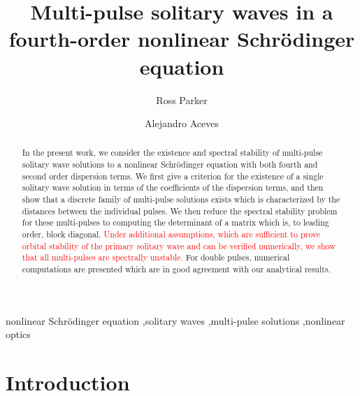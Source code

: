 \documentclass[12pt]{elsarticle}
\newcommand{\revised}[1]{ \textcolor{red}{#1} }
\begin{document}
\begin{frontmatter}

\title{Multi-pulse solitary waves in a fourth-order nonlinear {S}chr{\"o}dinger equation}

\author[1]{Ross Parker}
\author[1]{Alejandro Aceves}

\address[1]{Department of Mathematics, Southern Methodist University, Dallas, Texas 75275}

\begin{abstract}
In the present work, we consider the existence and spectral stability of multi-pulse solitary wave solutions to a nonlinear Schr\"odinger equation with both fourth and second order dispersion terms. We first give a criterion for the existence of a single solitary wave solution in terms of the coefficients of the dispersion terms, and then show that a discrete family of multi-pulse solutions exists which is characterized by the distances between the individual pulses. We then reduce the spectral stability problem for these multi-pulses to computing the determinant of a matrix which is, to leading order, block diagonal. \revised{Under additional assumptions, which are sufficient to prove orbital stability of the primary solitary wave and can be verified numerically, we show that all multi-pulses are spectrally unstable.} For double pulses, numerical computations are presented which are in good agreement with our analytical results.
\end{abstract}

\begin{keyword}
nonlinear Schr\"{o}dinger equation \sep solitary waves \sep multi-pulse solutions \sep nonlinear optics 
\end{keyword}

\end{frontmatter}

\section{Introduction}
\end{document}
